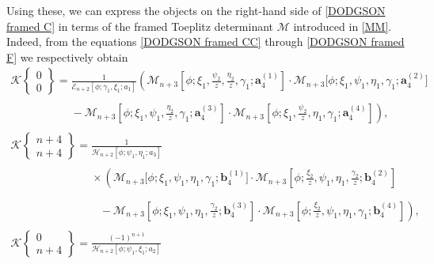 \documentclass[10pt,a4paper]{amsart}
\numberwithin{equation}{section}
\newcommand{\ga}{\gamma}
\begin{document}
		Using these, we can express the objects on the right-hand side of \eqref{DODGSON framed C} in terms of the framed Toeplitz determinant $\mathscr{M}$ introduced in \eqref{MM}. Indeed, from the equations \eqref{DODGSON framed CC} through \eqref{DODGSON framed F} we respectively obtain
		\begin{gather*}
				\mathscr{K}\left\lbrace \begin{matrix} 0 \\ 0 \end{matrix} \right\rbrace = \frac{1}{\mathscr{E}_{n+2}[\phi;\ga_1,\xi_1;a_1]} \left( \mathscr{M}_{n+3}\left[\phi; \xi_1, \frac{\psi_2}{z}, \frac{\eta_2}{z}, \ga_1; \boldsymbol{a}^{(1)}_4\right]\cdot \mathscr{M}_{n+3}\big[\phi; \xi_1, \psi_1, \eta_1, \ga_1; \boldsymbol{a}^{(2)}_4\big] \right. \\
\phantom{\mathscr{K}\left\lbrace \begin{matrix} 0 \\ 0 \end{matrix} \right\rbrace =}{} - \left. \mathscr{M}_{n+3}\left[\phi; \xi_1, \psi_1, \frac{\eta_2}{z}, \ga_1; \boldsymbol{a}^{(3)}_4\right]\cdot \mathscr{M}_{n+3}\left[\phi; \xi_1, \frac{\psi_2}{z}, \eta_1, \ga_1; \boldsymbol{a}^{(4)}_4\right] \right),
\\
				\mathscr{K}\left\lbrace \begin{matrix} n+4 \\ n+4 \end{matrix} \right\rbrace = \frac{1}{\mathscr{H}_{n+2}[\phi;\psi_1,\eta_1;a_3]}\\
\phantom{\mathscr{K}\left\lbrace \begin{matrix} n+4 \\ n+4 \end{matrix} \right\rbrace= }{} \times \left( \mathscr{M}_{n+3}\big[\phi; \xi_1, \psi_1, \eta_1, \ga_1; \boldsymbol{b}^{(1)}_4\big]\cdot \mathscr{M}_{n+3}\left[\phi; \frac{\xi_2}{z}, \psi_1, \eta_1, \frac{\ga_2}{z}; \boldsymbol{b}^{(2)}_4\right] \right. \\
\phantom{\mathscr{K}\left\lbrace \begin{matrix} n+4 \\ n+4 \end{matrix} \right\rbrace =\times}{} - \left. \mathscr{M}_{n+3}\left[\phi; \xi_1, \psi_1, \eta_1, \frac{\ga_2}{z}; \boldsymbol{b}^{(3)}_4\right]\cdot \mathscr{M}_{n+3}\left[\phi; \frac{\xi_2}{z}, \psi_1, \eta_1, \ga_1; \boldsymbol{b}^{(4)}_4\right] \right),
\\
				\mathscr{K}\left\lbrace \begin{matrix} 0 \\ n+4 \end{matrix} \right\rbrace = \frac{(-1)^{n+1}}{\mathscr{H}_{n+2}[\phi;\psi_1,\xi_1;a_2]} \\

\end{gather*}
\end{document}
